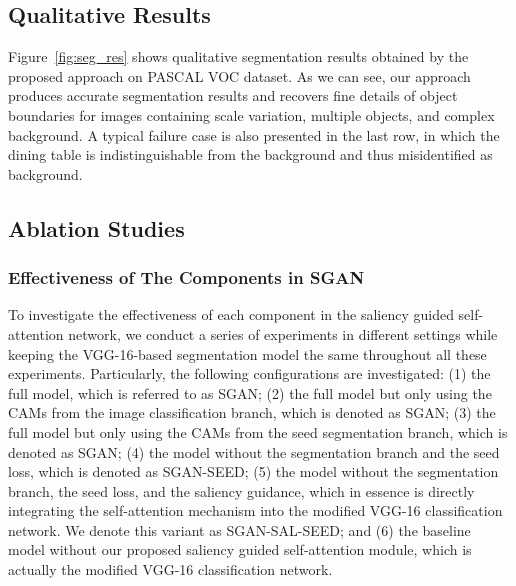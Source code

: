 \documentclass[journal]{IEEEtran}
\begin{document}
\subsection{Qualitative Results}
Figure~\ref{fig:seg_res} shows qualitative segmentation results obtained by the proposed approach on PASCAL VOC dataset. As we can see, our approach produces accurate segmentation results and recovers fine details of object boundaries for images containing scale variation, multiple objects, and complex background. A typical failure case is also presented in the last row, in which the dining table is indistinguishable from the background and thus misidentified as background. 

\subsection{Ablation Studies}
\label{sec:ablation}
\subsubsection{Effectiveness of The Components in SGAN}
To investigate the effectiveness of each component in the saliency guided self-attention network, we conduct a series of experiments in different settings while keeping the VGG-16-based segmentation model the same throughout all these experiments. Particularly, the following configurations are investigated: (1) the full model, which is referred to as SGAN; (2) the full model but only using the CAMs from the image classification branch, which is denoted as SGAN;  (3) the full model but only using the CAMs from the seed segmentation branch, which is denoted as SGAN; (4) the model without the segmentation branch and the seed loss, which is denoted as SGAN-SEED; (5) the model without the segmentation branch, the seed loss, and the saliency guidance, which in essence is directly integrating the self-attention mechanism into the modified VGG-16 classification network. We denote this variant as SGAN-SAL-SEED; and (6) the baseline model without our proposed saliency guided self-attention module, which is actually the modified VGG-16 classification network. 
\end{document}
